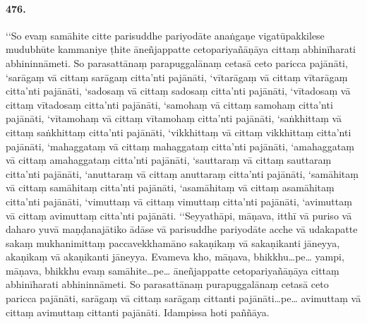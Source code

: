 \paragraph{476.} ‘‘So evaṃ samāhite citte parisuddhe pariyodāte anaṅgaṇe vigatūpakkilese mudubhūte kammaniye ṭhite āneñjappatte cetopariyañāṇāya cittaṃ abhinīharati abhininnāmeti. So parasattānaṃ parapuggalānaṃ cetasā ceto paricca pajānāti, ‘sarāgaṃ vā cittaṃ sarāgaṃ citta’nti pajānāti, ‘vītarāgaṃ vā cittaṃ vītarāgaṃ citta’nti pajānāti, ‘sadosaṃ vā cittaṃ sadosaṃ citta’nti pajānāti, ‘vītadosaṃ vā cittaṃ vītadosaṃ citta’nti pajānāti, ‘samohaṃ vā cittaṃ samohaṃ citta’nti pajānāti, ‘vītamohaṃ vā cittaṃ vītamohaṃ citta’nti pajānāti, ‘saṅkhittaṃ vā cittaṃ saṅkhittaṃ citta’nti pajānāti, ‘vikkhittaṃ vā cittaṃ vikkhittaṃ citta’nti pajānāti, ‘mahaggataṃ vā cittaṃ mahaggataṃ citta’nti pajānāti, ‘amahaggataṃ vā cittaṃ amahaggataṃ citta’nti pajānāti, ‘sauttaraṃ vā cittaṃ sauttaraṃ citta’nti pajānāti, ‘anuttaraṃ vā cittaṃ anuttaraṃ citta’nti pajānāti, ‘samāhitaṃ vā cittaṃ samāhitaṃ citta’nti pajānāti, ‘asamāhitaṃ vā cittaṃ asamāhitaṃ citta’nti pajānāti, ‘vimuttaṃ vā cittaṃ vimuttaṃ citta’nti pajānāti, ‘avimuttaṃ vā cittaṃ avimuttaṃ citta’nti pajānāti. ‘‘Seyyathāpi, māṇava, itthī vā puriso vā daharo yuvā maṇḍanajātiko ādāse vā parisuddhe pariyodāte acche vā udakapatte sakaṃ mukhanimittaṃ paccavekkhamāno sakaṇikaṃ vā sakaṇikanti jāneyya, akaṇikaṃ vā akaṇikanti jāneyya. Evameva kho, māṇava, bhikkhu…pe… yampi, māṇava, bhikkhu evaṃ samāhite…pe… āneñjappatte cetopariyañāṇāya cittaṃ abhinīharati abhininnāmeti. So parasattānaṃ purapuggalānaṃ cetasā ceto paricca pajānāti, sarāgaṃ vā cittaṃ sarāgaṃ cittanti pajānāti…pe… avimuttaṃ vā cittaṃ avimuttaṃ cittanti pajānāti. Idampissa hoti paññāya.

